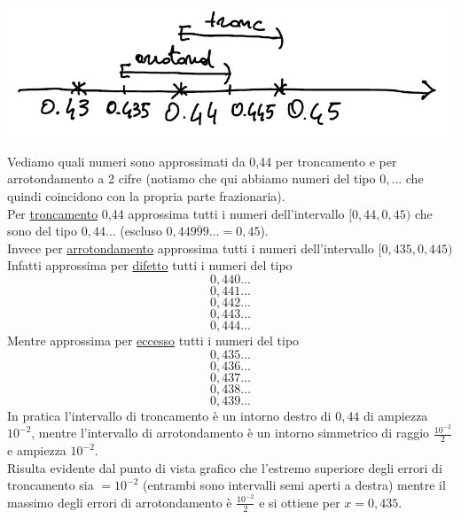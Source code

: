 \documentclass[12pt]{article}
\begin{document}
\begin{center}
    \includegraphics[scale=0.65]{img1}
\end{center}
Vediamo quali numeri sono approssimati da 0,44 per troncamento e per arrotondamento a 2 cifre (notiamo che qui abbiamo numeri del tipo $0,\dotsc$ che quindi coincidono con la propria parte frazionaria).\\
Per \uline{troncamento} 0,44 approssima tutti i numeri dell'intervallo $[0,44 , 0,45)$ che sono del tipo $0,44\dotsc$ (escluso $0,44\overline{999}\dotsc = 0,45$).\\
Invece per \uline{arrotondamento} approssima tutti i numeri dell'intervallo $[0,435 , 0,445)$ \\ 
Infatti approssima per \uline{difetto} tutti i numeri del tipo \[ 0,440\dotsc \] \[ 0,441\dotsc \] \[ 0,442\dotsc \] \[ 0,443\dotsc \] \[ 0,444\dotsc \]
Mentre approssima per \uline{eccesso} tutti i numeri del tipo \[ 0,435\dotsc \] \[ 0,436\dotsc \] \[ 0,437\dotsc \] \[ 0,438\dotsc \] \[ 0,439\dotsc \]
In pratica l'intervallo di troncamento è un intorno destro di $0,44$ di ampiezza $10^{-2}$, mentre l'intervallo di arrotondamento è un intorno simmetrico di raggio $\frac{10^{-2}}{2}$ e ampiezza $10^{-2}$.\\
Risulta evidente dal punto di vista grafico che l'estremo superiore degli errori di troncamento sia $= 10^{-2}$ (entrambi sono intervalli semi aperti a destra) mentre il massimo degli errori di arrotondamento è $\frac{10^{-2}}{2}$ e si ottiene per $x = 0,435$.
\end{document}
